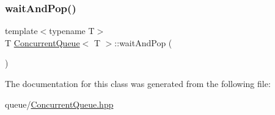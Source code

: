\mbox{\label{classConcurrentQueue_a1ea1e6082792691143b62317a9ac99ac}} 
\subsubsection{\texorpdfstring{wait\+And\+Pop()}{waitAndPop()}}
{\footnotesize\ttfamily template$<$typename T$>$ \\
T \mbox{\hyperlink{classConcurrentQueue}{Concurrent\+Queue}}$<$ T $>$\+::wait\+And\+Pop (\begin{DoxyParamCaption}{ }\end{DoxyParamCaption})\hspace{0.3cm}{\ttfamily [inline]}}



The documentation for this class was generated from the following file\+:\begin{DoxyCompactItemize}
\item 
queue/\mbox{\hyperlink{ConcurrentQueue_8hpp}{Concurrent\+Queue.\+hpp}}\end{DoxyCompactItemize}
